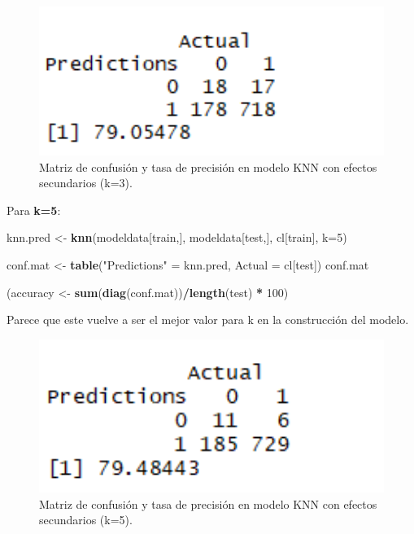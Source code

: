 \documentclass[spanish,]{article}
\newenvironment{Shaded}{\begin{snugshade}}{\end{snugshade}}
\newcommand{\KeywordTok}[1]{\textcolor[rgb]{0.13,0.29,0.53}{\textbf{#1}}}
\newcommand{\DataTypeTok}[1]{\textcolor[rgb]{0.13,0.29,0.53}{#1}}
\newcommand{\DecValTok}[1]{\textcolor[rgb]{0.00,0.00,0.81}{#1}}
\newcommand{\StringTok}[1]{\textcolor[rgb]{0.31,0.60,0.02}{#1}}
\newcommand{\OperatorTok}[1]{\textcolor[rgb]{0.81,0.36,0.00}{\textbf{#1}}}
\newcommand{\NormalTok}[1]{#1}
\begin{document}
\begin{figure}[h]
    \centering
    \includegraphics[width=1\textwidth]{figuras/KNN/effects_k3.png}
    \caption{Matriz de confusión y tasa de precisión en modelo KNN con efectos secundarios (k=3).}
    \label{fig:KNN:effectsK3}
\end{figure}

Para \textbf{k=5}:

\begin{Shaded}
\begin{Highlighting}[]
\NormalTok{knn.pred <-}\StringTok{ }\KeywordTok{knn}\NormalTok{(modeldata[train,], modeldata[test,], cl[train], }\DataTypeTok{k=}\DecValTok{5}\NormalTok{) }

\NormalTok{conf.mat <-}\StringTok{ }\KeywordTok{table}\NormalTok{(}\StringTok{"Predictions"}\NormalTok{ =}\StringTok{ }\NormalTok{knn.pred, }\DataTypeTok{Actual =}\NormalTok{ cl[test])}
\NormalTok{conf.mat}

\NormalTok{(accuracy <-}\StringTok{ }\KeywordTok{sum}\NormalTok{(}\KeywordTok{diag}\NormalTok{(conf.mat))}\OperatorTok{/}\KeywordTok{length}\NormalTok{(test) }\OperatorTok{*}\StringTok{ }\DecValTok{100}\NormalTok{)}
\end{Highlighting}
\end{Shaded}

Parece que este vuelve a ser el mejor valor para k en la construcción
del modelo.

\begin{figure}[h]
    \centering
    \includegraphics[width=1\textwidth]{figuras/KNN/effects_k5.png}
    \caption{Matriz de confusión y tasa de precisión en modelo KNN con efectos secundarios (k=5).}
    \label{fig:KNN:effectsK5}
\end{figure}
\end{document}
